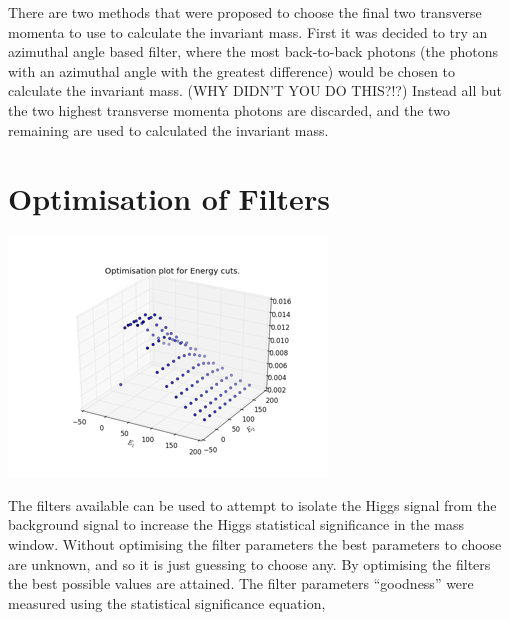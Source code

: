 \documentclass[11pt]{amsart}
\newenvironment{Figure}
  {\par\medskip\noindent\minipage{\linewidth}}
  {\endminipage\par\medskip}
\begin{document}
\begin{multicols}{2}
There are two methods that were proposed to choose the final two transverse momenta to use to calculate the invariant mass. First it was decided to try an azimuthal angle based filter, where the most back-to-back photons (the photons with an azimuthal angle with the greatest difference) would be chosen to calculate the invariant mass. (WHY DIDN'T YOU DO THIS?!?) Instead all but the two highest transverse momenta photons are discarded, and the two remaining are used to calculated the invariant mass.


\section{Optimisation of Filters}
\label{sec:optimisation}

\begin{Figure}
  \centering
  \includegraphics[width=\linewidth]{energy}
  \label{fig:energy}
\end{Figure}

The filters available can be used to attempt to isolate the Higgs signal from the background signal to increase the Higgs statistical significance in the mass window. Without optimising the filter parameters the best parameters to choose are unknown, and so it is just guessing to choose any. By optimising the filters the best possible values are attained. The filter parameters ``goodness'' were measured using the statistical significance equation,


\end{multicols}
\end{document}

